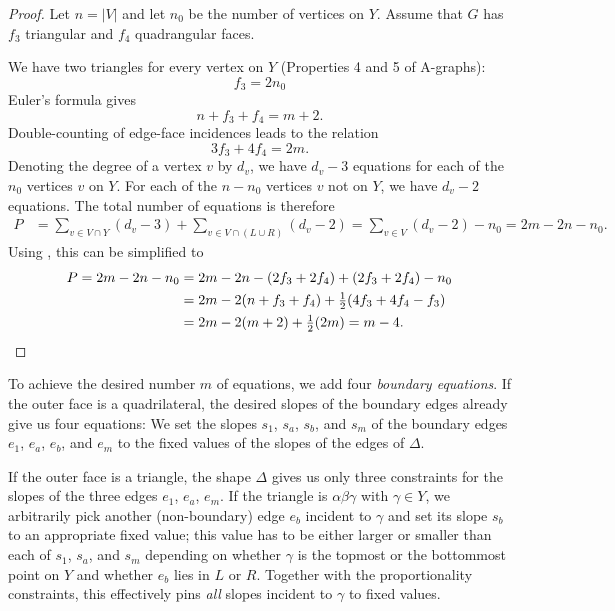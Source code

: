 \begin{proof}
Let $n=|V|$ and let $n_0$ be the number
of vertices on $Y$. Assume that $G$ has $f_3$ triangular and $f_4$
quadrangular faces.

We have two triangles for every vertex on $Y$ (Properties 4 and 5 of A-graphs):
\begin{equation}
\label{eq:f3}
f_3 = 2n_0
\end{equation}
Euler's formula gives
\begin{equation}
\label{eq:Euler}
n + f_3+f_4 = m+2.
\end{equation}
Double-counting of edge-face incidences leads to the relation
\begin{equation}
\label{eq:edge-face}
3f_3+4f_4=2m.
\end{equation}
Denoting the degree of a vertex $v$ by $d_v$,
we have $d_v-3$ equations for each of the $n_0$ vertices $v$ on $Y$. For each of the 
$n-n_0$ vertices $v$ not on $Y$, 
we have $d_v-2$ equations.
The total number of equations is therefore
\begin{align*}
P &= 
\sum_{v\in V\cap Y}(d_v-3)+
\sum_{v\in V\cap(L\cup R)}(d_v-2)
=
\sum_{v\in V}(d_v-2)-n_0
=
2m-2n-n_0.
\end{align*}
Using \thetag{\ref{eq:f3}--\ref{eq:edge-face}}, this can be
simplified to
\begin{align*}
  P%
      =
   2m-2n-n_0%
 &
                 = 2m -2n -(2f_3+2f_4) +(2f_3+2f_4)-n_0\\
&= 2m -2(n +f_3+f_4) +\tfrac12(4f_3+4f_4-f_3)\\
 &= 2m -2(m+2) +\tfrac12(2m) = m-4.
   \qedhere
\end{align*}
\end{proof}

To achieve the desired number $m$ of equations, we add
four \emph{boundary equations}.  If the outer face is a quadrilateral,
the desired slopes of the boundary edges already give us four equations:
We set
the slopes $s_1$, $s_a$, $s_b$, and $s_m$ of the boundary edges $e_1$, $e_a$,
$e_b$, and $e_m$ to the fixed values of the slopes of the edges of
$\Delta$.

If the outer face is a triangle, the shape $\Delta$ gives us
 only three constraints for the slopes of the three edges
 $e_1$, $e_a$, $e_m$.
 If the triangle is $\alpha\beta\gamma$ with $\gamma\in Y$, 
we arbitrarily pick another (non-boundary) edge $e_b$ incident to
$\gamma$ and set its slope $s_b$ to an appropriate fixed value;
this value has to be either larger or smaller than each of $s_1$,
$s_a$, and $s_m$
depending on whether $\gamma$ is the topmost or the bottommost point
on $Y$ and whether $e_b$ lies in $L$ or $R$.
Together with the
proportionality constraints, this effectively pins \emph{all} slopes
incident to $\gamma$ to fixed values.

